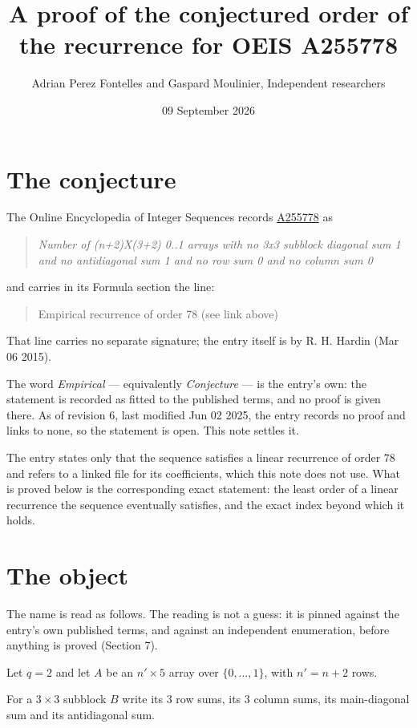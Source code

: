 \documentclass[11pt]{article}
\title{A proof of the conjectured order of the recurrence for OEIS A255778}
\author{Adrian Perez Fontelles and Gaspard Moulinier, Independent researchers}
\date{09 September 2026}
\theoremstyle{definition}
\begin{document}
\maketitle
\section{The conjecture}

The Online Encyclopedia of Integer Sequences records \href{https://oeis.org/A255778}{A255778} as

\begin{quote}\itshape Number of (n+2)X(3+2) 0..1 arrays with no 3x3 subblock diagonal sum 1 and no antidiagonal sum 1 and no row sum 0 and no column sum 0\end{quote}

and carries in its Formula section the line:

\begin{quote}\ttfamily Empirical recurrence of order 78 (see link above)\end{quote}

That line carries no separate signature; the entry itself is by R. H. Hardin (Mar 06 2015).

The word {\itshape Empirical} --- equivalently {\itshape Conjecture} --- is the entry's own: the statement is recorded as fitted to the published terms, and no proof is given there. As of revision 6, last modified Jun 02 2025, the entry records no proof and links to none, so the statement is open. This note settles it.

The entry states only that the sequence satisfies a linear recurrence of order $78$ and refers to a linked file for its coefficients, which this note does not use. What is proved below is the corresponding exact statement: the least order of a linear recurrence the sequence eventually satisfies, and the exact index beyond which it holds.

\section{The object}

The name is read as follows. The reading is not a guess: it is pinned against the entry's own published terms, and against an independent enumeration, before anything is proved (Section 7).

Let $q = 2$ and let $A$ be an $n' \times 5$ array over $\{0,\dots,1\}$, with $n' = n + 2$ rows.

For a $3\times3$ subblock $B$ write its 3 row sums, its 3 column sums, its main-diagonal sum and its antidiagonal sum.
\end{document}
